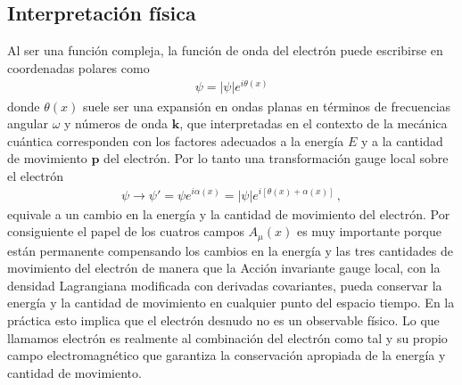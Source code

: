 \subsection{Interpretación física}
Al ser una función compleja, la función de onda del electrón puede escribirse en coordenadas polares como
\begin{align}
  \psi=|\psi|e^{i\theta(x)}
\end{align}
donde $\theta(x)$ suele ser una expansión en ondas planas en términos de frecuencias angular $\omega$ y números de onda $\mathbf{k}$, que interpretadas en el contexto de la mecánica cuántica corresponden con los factores adecuados a la energía $E$ y a la cantidad de movimiento $\mathbf{p}$ del electrón. Por lo tanto una transformación gauge local sobre el electrón
\begin{align}
  \psi\to \psi'=\psi e^{i\alpha(x)}=|\psi|e^{i[\theta(x)+\alpha(x)]}\,,
\end{align}
equivale a un cambio en la energía y la cantidad de movimiento del electrón. Por consiguiente el papel de los cuatros campos $A_{\mu}(x)$ es muy importante porque están permanente compensando los cambios en la energía y las tres cantidades de movimiento del electrón de manera que la Acción invariante gauge local, con la densidad Lagrangiana modificada con derivadas covariantes, pueda conservar la energía y la cantidad de movimiento en cualquier punto del espacio tiempo. En la práctica esto implica que el electrón desnudo no es un observable físico. Lo que llamamos electrón es realmente al combinación del electrón como tal y su propio campo electromagnético que garantiza la conservación apropiada de la energía y cantidad de movimiento. 






